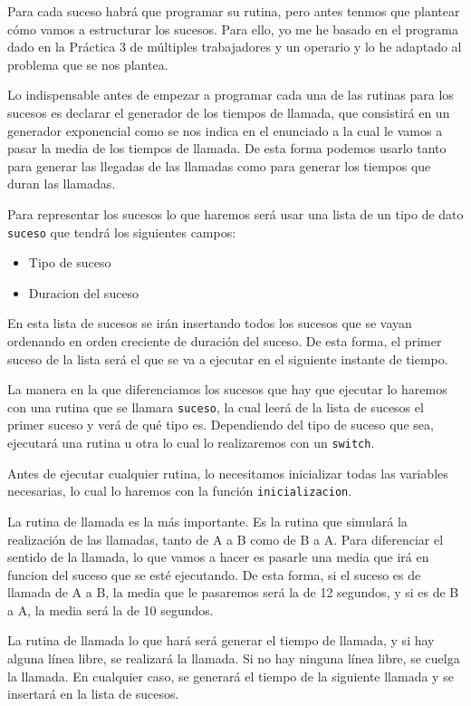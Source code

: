 \documentclass[11pt,a4paper]{report}
\begin{document}
Para cada suceso habrá que programar su rutina, pero antes tenmos que plantear cómo vamos a estructurar los sucesos. Para ello, yo me he basado en el programa dado en la Práctica 3 de múltiples trabajadores y un operario y lo he adaptado al problema que se nos plantea.

Lo indispensable antes de empezar a programar cada una de las rutinas para los sucesos es declarar el generador de los tiempos de llamada, que consistirá en un generador exponencial como se nos indica en el enunciado a la cual le vamos a pasar la media de los tiempos de llamada. De esta forma podemos usarlo tanto para generar las llegadas de las llamadas como para generar los tiempos que duran las llamadas.

Para representar los sucesos lo que haremos será usar una lista de un tipo de dato \texttt{suceso} que tendrá los siguientes campos:

\begin{itemize}
	\item{Tipo de suceso}
	\item{Duracion del suceso}
\end{itemize}

En esta lista de sucesos se irán insertando todos los sucesos que se vayan ordenando en orden creciente de duración del suceso. De esta forma, el primer suceso de la lista será el que se va a ejecutar en el siguiente instante de tiempo.

La manera en la que diferenciamos los sucesos que hay que ejecutar lo haremos con una rutina que se llamara \texttt{suceso}, la cual leerá de la lista de sucesos el primer suceso y verá de qué tipo es. Dependiendo del tipo de suceso que sea, ejecutará una rutina u otra lo cual lo realizaremos con un \texttt{switch}. 

Antes de ejecutar cualquier rutina, lo necesitamos inicializar todas las variables necesarias, lo cual lo haremos con la función \texttt{inicializacion}.

La rutina de llamada es la más importante. Es la rutina que simulará la realización de las llamadas, tanto de A a B como de B a A. Para diferenciar el sentido de la llamada, lo que vamos a hacer es pasarle una media que irá en funcion del suceso que se esté ejecutando. De esta forma, si el suceso es de llamada de A a B, la media que le pasaremos será la de 12 segundos, y si es de B a A, la media será la de 10 segundos.

La rutina de llamada lo que hará será generar el tiempo de llamada, y si hay alguna línea libre, se realizará la llamada. Si no hay ninguna línea libre, se cuelga la llamada. En cualquier caso, se generará el tiempo de la siguiente llamada y se insertará en la lista de sucesos.
\end{document}
